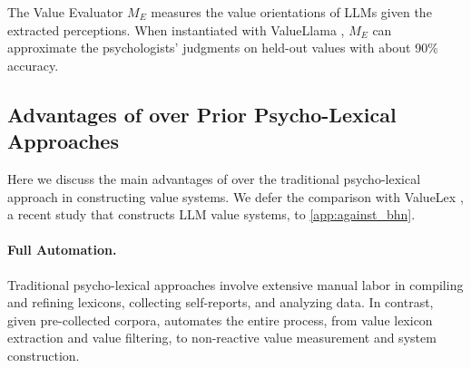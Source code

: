 The Value Evaluator \( M_{E} \) measures the value orientations of LLMs given the extracted perceptions. When instantiated with ValueLlama \cite{ye2025gpv}, \( M_{E} \) can approximate the psychologists' judgments on held-out values with about 90\% accuracy.


\subsection{Advantages of \our{} over Prior Psycho-Lexical Approaches}

Here we discuss the main advantages of \our{} over the traditional psycho-lexical approach in constructing value systems. We defer the comparison with ValueLex \cite{biedma2024beyond}, a recent study that constructs LLM value systems, to \cref{app:against_bhn}.

\paragraph{Full Automation.} Traditional psycho-lexical approaches involve extensive manual labor in compiling and refining lexicons, collecting self-reports, and analyzing data. In contrast, given pre-collected corpora, \our{} automates the entire process, from value lexicon extraction and value filtering, to non-reactive value measurement and system construction.

